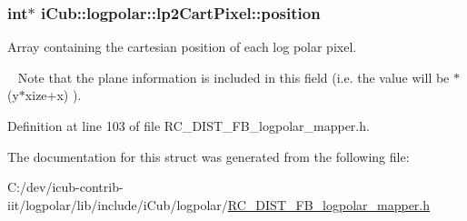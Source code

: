 \subsubsection[{position}]{\setlength{\rightskip}{0pt plus 5cm}int$\ast$ i\+Cub\+::logpolar\+::lp2\+Cart\+Pixel\+::position}\label{structiCub_1_1logpolar_1_1lp2CartPixel_a88ee1c54afe68b3a553d48a985981a48}


Array containing the cartesian position of each log polar pixel. 

~\newline
 Note that the plane information is included in this field (i.\+e. the value will be {$\ast$}({\ttfamily y$\ast$xize+x}) ). 

Definition at line 103 of file R\+C\+\_\+\+D\+I\+S\+T\+\_\+\+F\+B\+\_\+logpolar\+\_\+mapper.\+h.



The documentation for this struct was generated from the following file\+:\begin{DoxyCompactItemize}
\item 
C\+:/dev/icub-\/contrib-\/iit/logpolar/lib/include/i\+Cub/logpolar/\hyperlink{RC__DIST__FB__logpolar__mapper_8h}{R\+C\+\_\+\+D\+I\+S\+T\+\_\+\+F\+B\+\_\+logpolar\+\_\+mapper.\+h}\end{DoxyCompactItemize}
